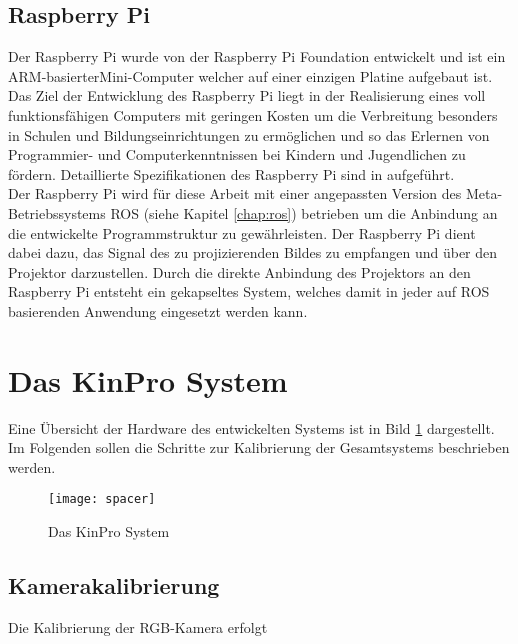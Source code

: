 \subsection{Raspberry Pi}
Der Raspberry Pi wurde von der Raspberry Pi Foundation  entwickelt und ist ein ARM-basierter\red[fußnote?] Mini-Computer welcher auf einer einzigen Platine aufgebaut ist. Das Ziel der Entwicklung des Raspberry Pi liegt in der Realisierung eines voll funktionsfähigen Computers mit geringen Kosten um die Verbreitung besonders in Schulen und Bildungseinrichtungen zu ermöglichen und so das Erlernen von Programmier- und Computerkenntnissen bei Kindern und Jugendlichen zu fördern. Detaillierte Spezifikationen des Raspberry Pi sind in  aufgeführt.\\
Der Raspberry Pi wird für diese Arbeit mit einer angepassten Version des Meta-Betriebssystems ROS (siehe Kapitel \ref{chap:ros}) betrieben um die Anbindung an die entwickelte Programmstruktur zu gewährleisten. Der Raspberry Pi dient dabei dazu, das Signal des zu projizierenden Bildes zu empfangen und über den Projektor darzustellen. Durch die direkte Anbindung des Projektors an den Raspberry Pi entsteht ein gekapseltes System, welches damit in jeder auf ROS basierenden Anwendung eingesetzt werden kann.

\section{Das KinPro System}
Eine Übersicht der Hardware des entwickelten Systems ist in Bild \ref{fig.kinpro} dargestellt. Im Folgenden sollen die Schritte zur Kalibrierung der Gesamtsystems beschrieben werden.

\begin{figure}[ht]
	\begin{center}
		\texttt{[image: spacer]}
		\caption{Das KinPro System}
		\label{fig.kinpro}
	\end{center}
\end{figure}

\subsection{Kamerakalibrierung}
Die Kalibrierung der RGB-Kamera erfolgt 

